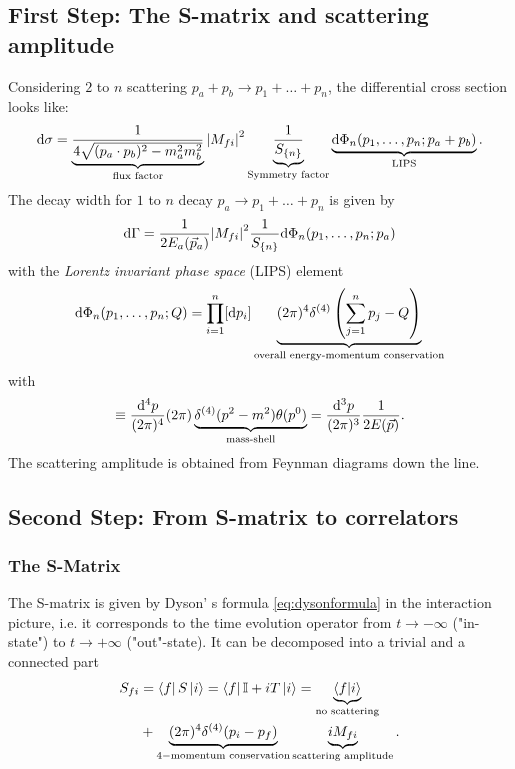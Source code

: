 \subsection{First Step: The S-matrix and scattering amplitude}
Considering $2$ to $n$ scattering $p_a+p_b \rightarrow p_1+\dots +p_n$, the differential cross section looks like:
\begin{equation}
\label{eq:crosssection}
	\mathrm{d} \sigma = \underbrace{\frac{1}{4 \sqrt{(p_a \cdot p_b)^2 -m^2_a m^2_b}}}_{\text{flux factor}} \abs{M_{fi}}^2 \underbrace{\frac{1}{S_{\{n\}}}}_{\text{Symmetry factor}} \underbrace{\mathrm{d} \Phi_n(p_1 ,\dots ,p_n; p_a+p_b)}_{\text{LIPS}}.
\end{equation}
The decay width for $1$ to $n$ decay $p_a \rightarrow p_1+\dots+ p_n$ is given by
\begin{equation}
	\label{eq:decaywidth}
	\mathrm{d} \Gamma = \frac{1}{2 E_a(\vec{p}_a)} \abs{M_{fi}}^2 \frac{1}{S_{\{n\}}} \mathrm{d} \Phi_n(p_1,\dots,p_n;p_a)
\end{equation}
with the \emph{Lorentz invariant phase space } (LIPS)  element
\begin{equation}
	\label{eq:lorentzinvps}
	\mathrm{d} \Phi_n(p_1,\dots,p_n;Q) = \prod_{i=1}^{n} [\mathrm{d} p_i] \underbrace{(2\pi)^4\delta^{(4)} \left(\sum_{j=1}^{n} p_j - Q\right)}_{\text{overall energy-momentum conservation}}
\end{equation}
with
\begin{equation}
	[\md p] \equiv \frac{\md^4 p}{(2 \pi)^4} (2 \pi) \underbrace{\delta^{(4)}(p^2-m^2) \theta(p^0)}_{\text{mass-shell}}= \frac{\md^3 p}{(2\pi)^3} \frac{1}{2 E(\vec{p})}.
\end{equation}
The scattering amplitude is obtained from Feynman diagrams down the line.



\subsection{Second Step: From S-matrix to correlators}
\subsubsection{The S-Matrix}
The S-matrix is given by Dyson' s formula \ref{eq:dysonformula} in the interaction picture, i.e. it corresponds to the time evolution operator from $t\rightarrow -\infty$ ("in-state") to $t\rightarrow + \infty$ ("out"-state). It can be decomposed into a trivial and a connected part
\begin{align}
S_{fi} &=\bra{f}S\ket{i} = \bra{f}\mathbb{I}+i T\ket{i} \nonumber =\underbrace{\braket{f}{i}}_{\text{no scattering}} \\
&+\underbrace{(2 \pi)^4 \delta^{(4)} (p_i -p_f)}_{4-\text{momentum conservation}} \underbrace{i M_{fi}}_{\text{scattering amplitude}}.
\end{align}
